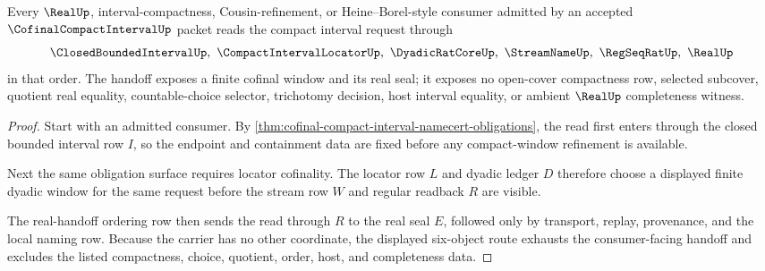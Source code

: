 \begin{theorem}
\label{thm:cofinal-compact-interval-real-handoff}
Every $\RealUp$, interval-compactness, Cousin-refinement, or Heine--Borel-style consumer admitted by an accepted $\CofinalCompactIntervalUp$ packet reads the compact interval request through
$$
\ClosedBoundedIntervalUp,\ \CompactIntervalLocatorUp,\ \DyadicRatCoreUp,\ \StreamNameUp,\ \RegSeqRatUp,\ \RealUp
$$
in that order. The handoff exposes a finite cofinal window and its real seal; it exposes no open-cover compactness row, selected subcover, quotient real equality, countable-choice selector, trichotomy decision, host interval equality, or ambient $\RealUp$ completeness witness.
\end{theorem}
\begin{proof}
Start with an admitted consumer. By \autoref{thm:cofinal-compact-interval-namecert-obligations}, the read first enters through the closed bounded interval row $I$, so the endpoint and containment data are fixed before any compact-window refinement is available.

Next the same obligation surface requires locator cofinality. The locator row $L$ and dyadic ledger $D$ therefore choose a displayed finite dyadic window for the same request before the stream row $W$ and regular readback $R$ are visible.

The real-handoff ordering row then sends the read through $R$ to the real seal $E$, followed only by transport, replay, provenance, and the local naming row. Because the carrier has no other coordinate, the displayed six-object route exhausts the consumer-facing handoff and excludes the listed compactness, choice, quotient, order, host, and completeness data.
\end{proof}



